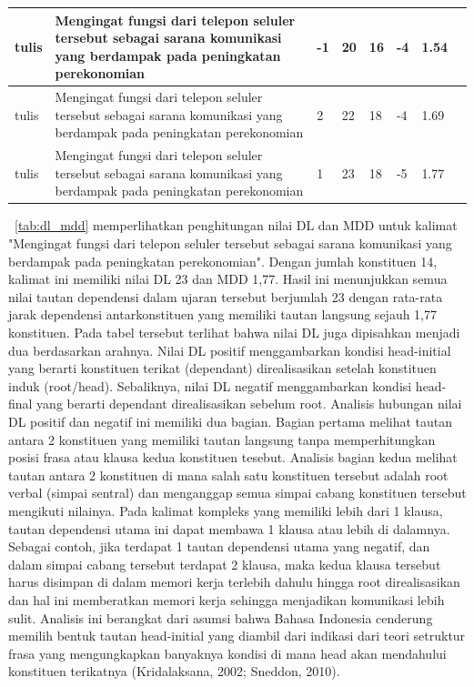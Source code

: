 \begin{center}
\begin{table}
\begin{tiny}
\begin{tabulary}{1\textwidth}{| L | L | L | L | L | L | L | L |}
tulis & Mengingat fungsi dari telepon seluler tersebut sebagai sarana komunikasi yang berdampak pada peningkatan perekonomian & -1 & 20 & 16 & -4 & 1.54 \\ \hline
tulis & Mengingat fungsi dari telepon seluler tersebut sebagai sarana komunikasi yang berdampak pada peningkatan perekonomian & 2 & 22 & 18 & -4 & 1.69 \\ \hline
tulis & Mengingat fungsi dari telepon seluler tersebut sebagai sarana komunikasi yang berdampak pada peningkatan perekonomian & 1 & 23 & 18 & -5 & 1.77 \\ \hline
  \end{tabulary}  
\end{tiny}
\end{table}
\end{center}

\tab~\ref{tab:dl_mdd} memperlihatkan penghitungan nilai DL dan MDD untuk kalimat "Mengingat fungsi dari telepon seluler tersebut sebagai sarana komunikasi yang berdampak pada peningkatan perekonomian". Dengan jumlah konstituen 14, kalimat ini memiliki nilai DL 23 dan MDD 1,77. Hasil ini menunjukkan semua nilai tautan dependensi dalam ujaran tersebut berjumlah 23 dengan rata-rata jarak dependensi antarkonstituen yang memiliki tautan langsung sejauh 1,77 konstituen. Pada tabel tersebut terlihat bahwa nilai DL juga dipisahkan menjadi dua berdasarkan arahnya. Nilai DL positif menggambarkan kondisi head-initial yang berarti konstituen terikat (dependant) direalisasikan setelah konstituen induk (root/head). Sebaliknya, nilai DL negatif menggambarkan kondisi head-final yang berarti dependant direalisasikan sebelum root. Analisis hubungan nilai DL positif dan negatif ini memiliki dua bagian. Bagian pertama melihat tautan antara 2 konstituen yang memiliki tautan langsung tanpa memperhitungkan posisi frasa atau klausa kedua konstituen tesebut. Analisis bagian kedua melihat tautan antara 2 konstituen di mana salah satu konstituen tersebut adalah root verbal (simpai sentral) dan menganggap semua simpai cabang konstituen tersebut mengikuti nilainya. Pada kalimat kompleks yang memiliki lebih dari 1 klausa, tautan dependensi utama ini dapat membawa 1 klausa atau lebih di dalamnya. Sebagai contoh, jika terdapat 1 tautan dependensi utama yang negatif, dan dalam simpai cabang tersebut terdapat 2 klausa, maka kedua klausa tersebut harus disimpan di dalam memori kerja terlebih dahulu hingga root direalisasikan dan hal ini memberatkan memori kerja sehingga menjadikan komunikasi lebih sulit. Analisis ini berangkat dari asumsi bahwa Bahasa Indonesia cenderung memilih bentuk tautan head-initial yang diambil dari indikasi dari teori setruktur frasa yang mengungkapkan banyaknya kondisi di mana head akan mendahului konstituen terikatnya (Kridalaksana, 2002; Sneddon, 2010).

